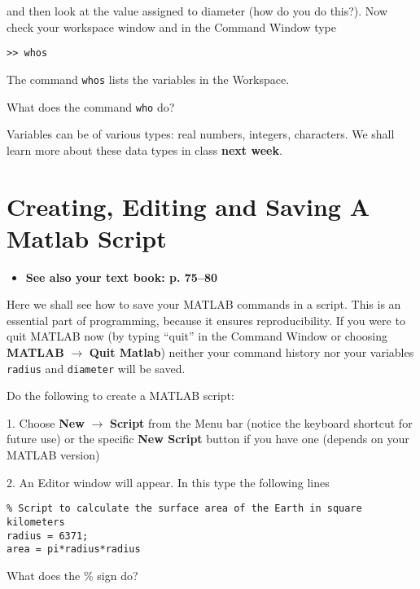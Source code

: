 \documentclass[letterpaper]{article}
\begin{document}
and then look at the value assigned to diameter (how do you do this?).  Now check your workspace window and in the Command Window type

\begin{verbatim}
>> whos
\end{verbatim}

The command \verb+whos+ lists the variables in the Workspace. 

What does the command \verb+who+ do?

Variables can be of various types: real numbers, integers, characters.  We shall learn more about these data types in class {\bf next week}.



\section {Creating, Editing and Saving A Matlab Script}


\begin{itemize}
\item {\bf See also your text book: p. 75--80} 
\end{itemize}


Here we shall see how to save your MATLAB commands in a script.  This is an essential part of programming, because
it ensures reproducibility.  If you were to quit MATLAB now (by typing ``quit'' in the Command Window or choosing 
{\bf MATLAB} $\rightarrow$ {\bf Quit Matlab}) neither your command history nor your variables \verb+radius+ and \verb+diameter+ will be saved.  

Do the following to create a MATLAB script:

1.  Choose {\bf New} $\rightarrow$ {\bf Script} from the Menu bar (notice the keyboard shortcut for future use) or the specific {\bf New Script} button if you have one (depends on your MATLAB version)

2.  An Editor window will appear.  In this type the following lines

\begin{verbatim}
% Script to calculate the surface area of the Earth in square kilometers
radius = 6371;
area = pi*radius*radius
\end{verbatim}

What does the \% sign do?
\end{document}
